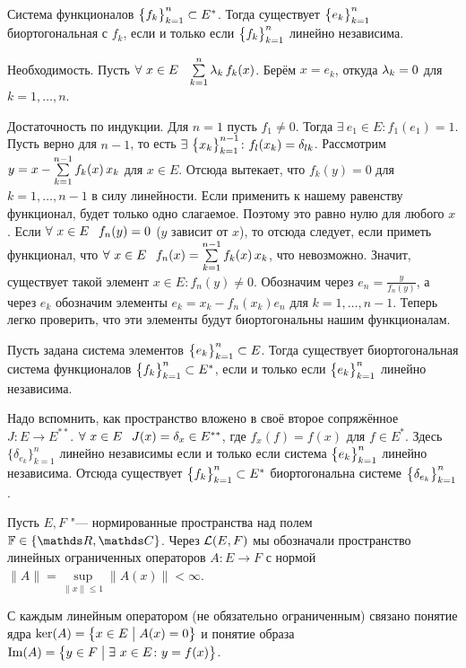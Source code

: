 \begin{The}
  Система функционалов $\ar fk1n\subset E^*$. Тогда существует $\ar ek1n$ биортогональная с $f_k$, если и только если $\ar fk1n$ линейно независима.
\end{The}
\begin{Proof}
 Необходимость. Пусть $\forall\ x\in E\pau  \RY k1n\l_k\,f_k(x)$. Берём $x = e_k$, откуда $\l_k=0$ для $k=1,\dots,n$.

Достаточность по индукции. Для $n=1$ пусть $f_1\ne 0$. Тогда $\exists\ e_1\in E\colon f_1(e_1)=1$. Пусть верно для $n-1$, то есть $\exists\ \ar xk1{n-1}\colon f_l(x_k) = \delta_{lk}$. Рассмотрим $y = x - \RY k1{n-1} f_k(x)\,x_k$ для $x\in E$. Отсюда вытекает, что $f_k(y)=0$ для $k=1,\dots,n-1$ в силу линейности. Если применить к нашему равенству функционал, будет только одно слагаемое. Поэтому это равно нулю для любого $x$.
Если  $\forall\ x\in E\pau f_n(y)=0$ ($y$ зависит от $x$), то отсюда следует, если приметь функционал, что $\forall\ x\in E\pau f_n(x) =\RY k1{n-1}f_k(x)\,x_k$, что невозможно. Значит, существует такой элемент $x\in E\colon f_n(y)\ne0$. Обозначим через $e_n=\frac{y}{f_n(y)}$, а через $e_k$ обозначим элементы $e_k = x_k - f_n(x_k)e_n$ для $k=1,\dots,n-1$. Теперь легко проверить, что эти элементы будут биортогональны нашим функционалам.
\end{Proof}
\begin{Sl}
Пусть задана система элементов $\ar ek1n\subset E$. Тогда существует биортогональная система функционалов $\ar fk1n\subset E^*$, если и только если $\ar ek1n$ линейно независима.
\end{Sl}
\begin{Proof}
Надо вспомнить, как пространство вложено в своё второе сопряжённое $J\colon E\to E^{**}$. $\forall\ x\in E\pau J(x) = \delta_x\in E^{**}$, где $f_x(f) = f(x)$ для $f\in E^*$. Здесь $\big\{\delta_{e_k}\big\}_{k=1}^n$ линейно независимы если и только если система $\ar ek1n$ линейно независима. Отсюда существует $\ar fk1n\subset E^*$ биортогональна системе $\big\{\d_{e_k}\big\}_{k=1}^n$.
\end{Proof}

Пусть $E,F$ "--- нормированные пространства над полем $\F\in\{\R,\C\}$. Через $\L(E,F)$ мы обозначали пространство линейных ограниченных операторов $A\colon E\to F$ с нормой $\|A\| = \sup\limits_{\|x\|\le1}\big\|A(x)\big\|<\infty$.

С каждым линейным оператором (не обязательно ограниченным) связано понятие ядра $\ker(A) = \big\{x\in E\bigm |A(x)=0\big\}$ и понятие образа $\Im(A) = \big\{y\in F\bigm|\exists\ x\in E\colon y=f(x)\big\}$.

